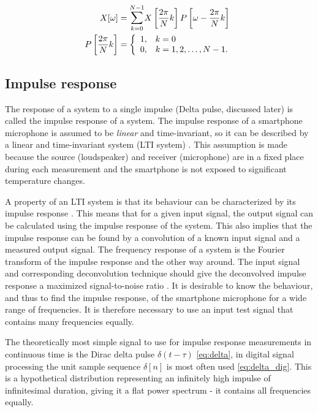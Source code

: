 \begin{equation}
\label{eqn:reconstruction_formula}
\begin{split}
X[\omega]&=\mathlarger\sum\limits_{k=0}^{N-1}X\left[\dfrac{2\pi}{N}k\right]P\left[\omega-\dfrac{2\pi}{N}k\right]\\
P\left[\dfrac{2\pi}{N}k\right]&=
\left\{
\begin{array}{ll}
1,&k=0\\
0,&k=1,2,\ldots,N-1.
\end{array}
\right.
\end{split}
\end{equation}


\subsection{Impulse response}
The response of a system to a single impulse (Delta pulse, discussed later) is called the impulse response of a system.
The impulse response of a smartphone microphone is assumed to be \textit{linear} and time-invariant, so it can be described by a linear and time-invariant system (LTI system) \cite[p.~17]{girod2001signals} \cite{Thomas2006, Stan2002249}.
This assumption is made because the source (loudspeaker) and receiver (microphone) are in a fixed place during each measurement and the smartphone is not exposed to significant temperature changes.
 
A property of an LTI system is that its behaviour can be characterized by its impulse response \cite[p.~105]{book:dsp}.
This means that for a given input signal, the output signal can be calculated using the impulse response of the system.
This also implies that the impulse response can be found by a convolution of a known input signal and a measured output signal.  
The frequency response of a system is the Fourier transform of the impulse response and the other way around.
The input signal and corresponding deconvolution technique should give the deconvolved impulse response a maximized signal-to-noise ratio \cite{Stan2002249}. 
It is desirable to know the behaviour, and thus to find the impulse response, of the smartphone microphone for a wide range of frequencies.
It is therefore necessary to use an input test signal that contains many frequencies equally. 

The theoretically most simple signal to use for impulse response measurements in continuous time is the Dirac delta pulse $\delta(t-\tau)$ \cite[p.~158-159]{girod2001signals} \eqref{eq:delta}, in digital signal processing the unit sample sequence $\delta[n]$ is most often used \cite[p.~42]{book:dsp} \eqref{eq:delta_dig}.
This is a hypothetical distribution representing an infinitely high impulse of infinitesimal duration, giving it a flat power spectrum - it contains all frequencies equally.

